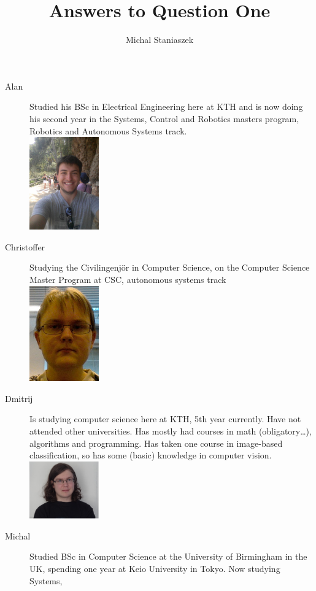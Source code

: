 \documentclass[10pt,a4paper]{article}
\author{Michal Staniaszek}
\title{Answers to Question One}
\begin{document}
\maketitle

\begin{description}
\item[Alan] Studied his BSc in Electrical Engineering here at KTH and is now
  doing his second year in the Systems, Control and Robotics masters program,
  Robotics and Autonomous Systems track.
  \\
  \includegraphics[width=3cm]{../images/alan.jpg}
\item[Christoffer] Studying the Civilingenjör in Computer Science, on the
  Computer Science Master Program at CSC, autonomous systems track
  \\
  \includegraphics[width=3cm]{../images/christoffer.jpg}
\item[Dmitrij] Is studying computer science here at KTH, 5th year currently.
  Have not attended other universities. Has mostly had courses in math
  (obligatory…), algorithms and programming. Has taken one course in
  image-based classification, so has some (basic) knowledge in computer
  vision.
  \\
  \includegraphics[width=3cm]{../images/dmitrij.jpg}
\item[Michal] Studied BSc in Computer Science at the University of Birmingham in
  the UK, spending one year at Keio University in Tokyo. Now studying Systems,

\end{description}
\end{document}

